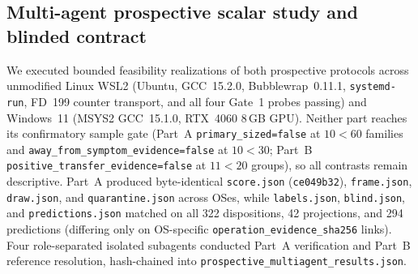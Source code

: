 \subsection{Multi-agent prospective scalar study and blinded contract}
\label{sec:prospective-multiagent}

We executed bounded feasibility realizations of both prospective protocols across unmodified Linux WSL2 (Ubuntu, GCC~15.2.0, Bubblewrap~0.11.1, \nolinkurl{systemd-run}, FD~199 counter transport, and all four Gate~1 probes passing) and Windows~11 (MSYS2 GCC~15.1.0, RTX~4060 8\,GB GPU). Neither part reaches its confirmatory sample gate (Part~A \nolinkurl{primary_sized=false} at $10 < 60$ families and \nolinkurl{away_from_symptom_evidence=false} at $10 < 30$; Part~B \nolinkurl{positive_transfer_evidence=false} at $11 < 20$ groups), so all contrasts remain descriptive. Part~A produced byte-identical \nolinkurl{score.json} (\texttt{ce049b32}), \nolinkurl{frame.json}, \nolinkurl{draw.json}, and \nolinkurl{quarantine.json} across OSes, while \nolinkurl{labels.json}, \nolinkurl{blind.json}, and \nolinkurl{predictions.json} matched on all 322 dispositions, 42 projections, and 294 predictions (differing only on OS-specific \nolinkurl{operation_evidence_sha256} links). Four role-separated isolated subagents conducted Part~A verification and Part~B reference resolution, hash-chained into \nolinkurl{prospective_multiagent_results.json}.

